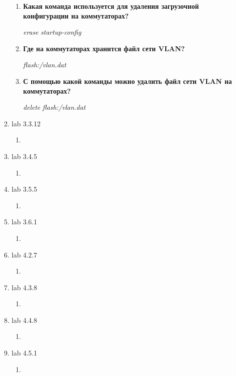 \documentclass[a4paper,14pt]{extarticle}
\begin{document}
\begin{enumerate}
\begin{enumerate}
            \item \textbf{Какая команда используется для удаления загрузочной конфигурации на коммутаторах?}\par
            \emph{erase startup-config}

            \item \textbf{Где на коммутаторах хранится файл сети VLAN?}\par
            \emph{flash:/vlan.dat}

            \item \textbf{С помощью какой команды можно удалить файл сети VLAN на коммутаторах?}\par
            \emph{delete flash:/vlan.dat}

        \end{enumerate}
        \item lab 3.3.12
        \begin{enumerate}
            \item 
        \end{enumerate}
        \item lab 3.4.5
        \begin{enumerate}
            \item 
        \end{enumerate}
        \item lab 3.5.5
        \begin{enumerate}
            \item 
        \end{enumerate}
        \item lab 3.6.1
        \begin{enumerate}
            \item 
        \end{enumerate}
        \item lab 4.2.7
        \begin{enumerate}
            \item 
        \end{enumerate}
        \item lab 4.3.8
        \begin{enumerate}
            \item 
        \end{enumerate}
        \item lab 4.4.8
        \begin{enumerate}
            \item 
        \end{enumerate}
        \item lab 4.5.1
        \begin{enumerate}
            \item 
        \end{enumerate}
    \end{enumerate}
\end{document}
